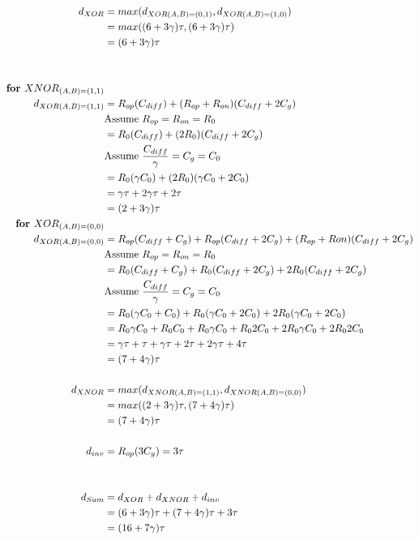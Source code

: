 \documentclass{article}
\begin{document}
\begin{align*}
d_{XOR} &= max(d_{XOR(A,B) = (0, 1)}, d_{XOR(A,B) = (1, 0)})\\
&= max((6 + 3\gamma)\tau, (6 + 3\gamma)\tau)\\
&= (6 + 3\gamma)\tau\\
\\
\\
\textbf{for $XNOR_{(A,B) = (1, 1)}$}\\
d_{XOR(A,B) = (1, 1)} &= R_{op}(C_{diff}) + (R_{op} + R_{on})(C_{diff} + 2C_{g})\\
&\textnormal{Assume $R_{op} = R_{on} = R_{0}$}\\
&= R_{0}(C_{diff}) + (2R_{0})(C_{diff} + 2C_{g})\\
&\textnormal{Assume $\frac{C_{diff}}{\gamma} = C_{g} = C_{0}$}\\
&= R_{0}(\gamma C_0) + (2R_{0})(\gamma C_{0} + 2C_{0})\\
&= \gamma\tau + 2\gamma\tau + 2\tau\\
&= (2 + 3\gamma)\tau
\\
\textbf{for $XOR_{(A,B) = (0, 0)}$}\\
d_{XOR(A,B) = (0, 0)} &= R_{op}(C_{diff} + C_g) + R_{op}(C_{diff} + 2C_g) + (R_{op} + R{on})(C_{diff} + 2C_g)\\
&\textnormal{Assume $R_{op} = R_{on} = R_{0}$}\\
&= R_{0}(C_{diff} + C_g) + R_{0}(C_{diff} + 2C_g) + 2R_{0}(C_{diff} + 2C_g)\\
&\textnormal{Assume $\frac{C_{diff}}{\gamma} = C_{g} = C_{0}$}\\
&= R_{0}(\gamma C_{0} + C_0) + R_{0}(\gamma C_{0} + 2C_0) + 2R_{0}(\gamma C_{0} + 2C_0)\\
&= R_{0}\gamma C_{0} + R_{0}C_0 + R_{0}\gamma C_{0} + R_{0}2C_0 + 2R_{0}\gamma C_{0} + 2R_{0}2C_0\\
&= \gamma\tau + \tau + \gamma\tau + 2\tau + 2\gamma\tau + 4\tau\\
&= (7 + 4\gamma)\tau\\
\\
d_{XNOR} &= max(d_{XNOR(A,B) = (1, 1)}, d_{XNOR(A,B) = (0, 0)})\\
&= max((2 + 3\gamma)\tau, (7 + 4\gamma)\tau)\\
&= (7 + 4\gamma)\tau
\\
\\
d_{inv} &= R_{op}(3C_g) = 3\tau\\
\\
\\
d_{Sum} &= d_{XOR} + d_{XNOR} + d_{inv}\\
&= (6 + 3\gamma)\tau + (7 + 4\gamma)\tau + 3\tau\\
&= (16 + 7\gamma)\tau
\end{align*}
\end{document}
